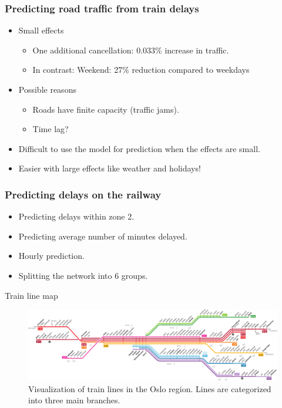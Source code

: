 \documentclass{beamer}
\begin{document}
\begin{frame}\frametitle{Predicting road traffic from train delays}
\begin{itemize}
\item Small effects
\begin{itemize}
\item One additional cancellation: 0.033\% increase in traffic.
\item In contrast: Weekend: 27\% reduction compared to weekdays
\end{itemize}
\item Possible reasons
\begin{itemize}
\item Roads have finite capacity (traffic jams).
\item Time lag?
\end{itemize}
\item Difficult to use the model for prediction when the effects are small.
\item Easier with large effects like weather and holidays!
\end{itemize}
\end{frame}

\begin{frame}\frametitle{Predicting delays on the railway}
\begin{itemize}
\item Predicting delays within zone 2.
\item Predicting average number of minutes delayed.
\item Hourly prediction.
\item Splitting the network into 6 groups.
\end{itemize}
\end{frame}

\begin{frame}{Train line map}
\begin{figure}
  \centering
   \includegraphics[width=1.0\textwidth]{plots/linjekart-crop.pdf}
    \caption{Visualization of train lines in the Oslo region. Lines are categorized into three main branches.}
\end{figure}
\end{frame}
\end{document}
